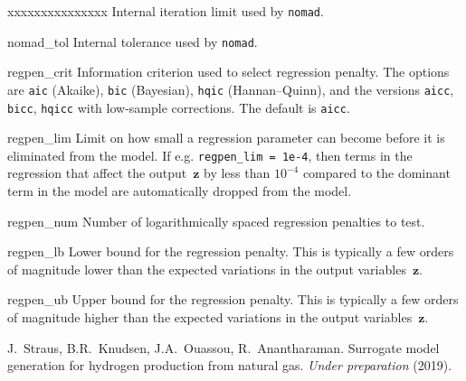 \documentclass[a4paper,bibliography=numbered]{scrartcl}
\begin{document}
\begin{labeling}{xxxxxxxxxxxxxxx}
        Internal iteration limit used by \texttt{nomad}.
    \item[nomad\_tol]
        Internal tolerance used by \texttt{nomad}.
    \item[regpen\_crit]
        Information criterion used to select regression penalty.
        The options are \texttt{aic} (Akaike), \texttt{bic} (Bayesian), \texttt{hqic} (Hannan--Quinn), and the versions \texttt{aicc}, \texttt{bicc}, \texttt{hqicc} with low-sample corrections.
        The default is \texttt{aicc}.
    \item[regpen\_lim]
        Limit on how small a regression parameter can become before it is eliminated from the model.
        If e.g. \texttt{regpen\_lim = 1e-4}, then terms in the regression that affect the output~$\bm{z}$ by less than $10^{-4}$ compared to the dominant term in the model are automatically dropped from the model.
    \item[regpen\_num]
        Number of logarithmically spaced regression penalties to test.
    \item[regpen\_lb]
        Lower bound for the regression penalty.
        This is typically a few orders of magnitude lower than the expected variations in the output variables~$\bm{z}$.
    \item[regpen\_ub]
        Upper bound for the regression penalty.
        This is typically a few orders of magnitude higher than the expected variations in the output variables~$\bm{z}$.
\end{labeling}

\begin{thebibliography}{10}
    J.~Straus, B.R.~Knudsen, J.A.~Ouassou, R.~Anantharaman.
    Surrogate model generation for hydrogen production from natural gas.
    \emph{Under preparation} (2019).
\end{thebibliography}
\end{document}
